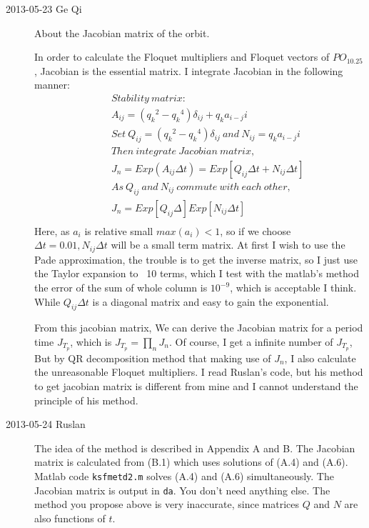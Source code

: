 \begin{description}
\item[2013-05-23 Ge Qi]About the Jacobian matrix of the orbit.

In order to calculate the Floquet multipliers and Floquet vectors of \(PO_{10.25}\), Jacobian is the essential matrix. I integrate Jacobian in the following manner:
\begin{eqnarray*}
    && Stability\ matrix: \\
    && A_{ij} = ({q_k}^2 - {q_k}^4)\delta_{ij} + {q_k}a_{i-j}i \\
    && Set\ Q_{ij} = ({q_k}^2 - {q_k}^4)\delta_{ij}\ and\ N_{ij} = {q_k}a_{i-j}i \\
    && Then\ integrate\ Jacobian\ matrix, \\
    && J_{n} = Exp(A_{ij}\Delta{t}) = Exp[Q_{ij}\Delta{t} + N_{ij}\Delta{t}] \\
    && As\ Q_{ij}\ and\ N_{ij}\ commute\ with\ each\ other, \\
    && J_{n} = Exp[Q_{ij}\Delta]Exp[N_{ij}\Delta{t}] \\
\end{eqnarray*}
    Here, as \(a_i\) is relative small \(max(a_i) < 1\), so if we choose \(\Delta{t} = 0.01, N_{ij}\Delta{t}\) will be a small term matrix. At first I wish to use the Pade approximation, the trouble is to get the inverse matrix, so I just use the Taylor expansion to ~10 terms, which I test with the matlab's method the error of the sum of whole column is \(10^{-9}\), which is acceptable I think.
    While \(Q_{ij}\Delta{t}\) is a diagonal matrix and easy to gain the exponential.


From this jacobian matrix, We can derive the Jacobian matrix for a period time \(J_{T_p}\), which is \(J_{T_p} = \prod_{n}{J_n}\). Of course, I get a infinite number of \(J_{T_p}\), But by QR decomposition method that making use of \(J_n\), I also calculate the unreasonable Floquet multipliers. I read Ruslan's code, but his method to get jacobian matrix is different from mine and I cannot understand the principle of his method.

\item[2013-05-24 Ruslan]
The idea of the method is described in  Appendix A and B.  The Jacobian matrix is calculated from (B.1) which uses solutions of (A.4) and (A.6).  Matlab code {\tt ksfmetd2.m} solves (A.4) and (A.6) simultaneously.  The Jacobian matrix is output in {\tt da}.  You don't need anything else.  The method you propose above is very inaccurate, since matrices $Q$ and $N$ are also functions of $t$.

\end{description}

\renewcommand{\ssp}{a}
